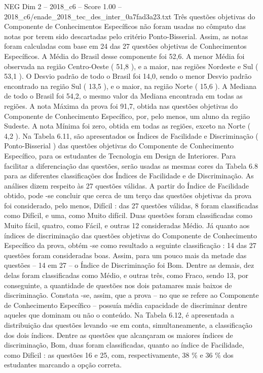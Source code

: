 \begin{textsample}{NEG Dim 2 – 2018\_c6 – Score 1.00 – 2018\_c6/enade\_2018\_tec\_des\_inter\_0a7fad3a23.txt}
Três questões objetivas do Componente de Conhecimentos Específicos não foram usadas no cômputo das notas por terem sido descartadas pelo critério Ponto-Bisserial.
Assim, as notas foram calculadas com base em 24 das 27 questões objetivas de Conhecimentos Específicos.
A Média do Brasil desse componente foi 52,6.
A menor Média foi observada na região Centro-Oeste ( 51,8 ), e a maior, nas regiões Nordeste e Sul ( 53,1 ).
O Desvio padrão de todo o Brasil foi 14,0, sendo o menor Desvio padrão encontrado na região Sul ( 13,5 ), e o maior, na região Norte ( 15,6 ).
A Mediana de todo o Brasil foi 54,2, o mesmo valor da Mediana encontrada em todas as regiões.
A nota Máxima da prova foi 91,7, obtida nas questões objetivas do Componente de Conhecimento Específico, por, pelo menos, um aluno da região Sudeste.
A nota Mínima foi zero, obtida em todas as regiões, exceto na Norte ( 4,2 ).
Na Tabela 6.11, são apresentados os Índices de Facilidade e Discriminação ( Ponto-Bisserial ) das questões objetivas do Componente de Conhecimento Específico, para os estudantes de Tecnologia em Design de Interiores.
Para facilitar a diferenciação das questões, serão usadas as mesmas cores da Tabela 6.8 para as diferentes classificações dos Índices de Facilidade e de Discriminação.
As análises dizem respeito às 27 questões válidas.
A partir do Índice de Facilidade obtido, pode -se concluir que cerca de um terço das questões objetivas da prova foi considerado, pelo menos, Difícil : das 27 questões válidas, 8 foram classificadas como Difícil, e uma, como Muito difícil.
Duas questões foram classificadas como Muito fácil, quatro, como Fácil, e outras 12 consideradas Médio.
Já quanto aos índices de discriminação das questões objetivas do Componente de Conhecimento Específico da prova, obtém -se como resultado a seguinte classificação : 14 das 27 questões foram consideradas boas.
Assim, para um pouco mais da metade das questões – 14 em 27 – o Índice de Discriminação foi Bom.
Dentre as demais, dez delas foram classificadas como Médio, e outras três, como Fraco, sendo 13, por conseguinte, a quantidade de questões nos dois patamares mais baixos de discriminação.
Constata -se, assim, que a prova – no que se refere ao Componente de Conhecimento Específico – possuía média capacidade de discriminar dentre aqueles que dominam ou não o conteúdo.
Na Tabela 6.12, é apresentada a distribuição das questões levando -se em conta, simultaneamente, a classificação dos dois índices.
Dentre as questões que alcançaram os maiores índices de discriminação, Bom, duas foram classificadas, quanto ao índice de Facilidade, como Difícil : as questões 16 e 25, com, respectivamente, 38 \% e 36 \% dos estudantes marcando a opção correta.

\end{textsample}
